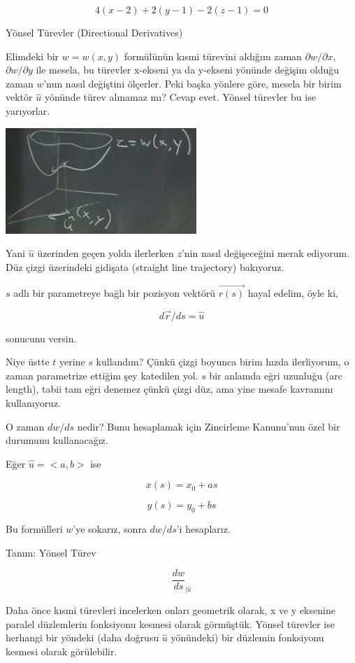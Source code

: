 \documentclass[12pt,fleqn]{article}\usepackage{../../common}
\begin{document}
$$ 4(x-2) + 2(y-1) - 2(z-1) = 0 $$

Yönsel Türevler (Directional Derivatives) 

Elimdeki bir $w = w(x,y)$ formülünün kısmi türevini aldığım zaman $\partial
w/\partial x$, $\partial w/\partial y$ ile mesela, bu türevler x-ekseni ya da
y-ekseni yönünde değişim olduğu zaman $w$'nun nasıl değiştini ölçerler. Peki
başka yönlere göre, mesela bir birim vektör $\hat{u}$ yönünde türev alınamaz mı?
Cevap evet. Yönsel türevler bu ise yarıyorlar.

\begin{center}
\includegraphics[height=4cm]{12_6.png}
\end{center}

Yani $\hat{u}$ üzerinden geçen yolda ilerlerken $z$'nin nasıl değişeceğini merak
ediyorum. Düz çizgi üzerindeki gidişata (straight line trajectory) bakıyoruz.

$s$ adlı bir parametreye bağlı bir pozisyon vektörü $\vec{r(s)}$ hayal
edelim, öyle ki,

$$ d\vec{r}/ds = \hat{u} $$

sonucunu versin.

Niye üstte $t$ yerine $s$ kullandım? Çünkü çizgi boyunca birim hızda
ilerliyorum, o zaman parametrize ettiğim şey katedilen yol. $s$ bir anlamda eğri
uzunluğu (arc length), tabii tam eğri denemez çünkü çizgi düz, ama yine mesafe
kavramını kullanıyoruz.

O zaman $dw/ds$ nedir? Bunu hesaplamak için Zincirleme Kanunu'nun özel bir
durumunu kullanacağız.

Eğer $\hat{u} = <a,b>$ ise

$$ x(s) = x_0 + as $$

$$ y(s) = y_0 + bs $$

Bu formülleri $w$'ye sokarız, sonra $dw/ds$'i hesaplarız. 

Tanım: Yönsel Türev

$$ \frac{dw}{ds}_{|\hat{u}} $$

Daha önce kısmi türevleri incelerken onları geometrik olarak, x ve y
eksenine paralel düzlemlerin fonksiyonu kesmesi olarak görmüştük. Yönsel
türevler ise herhangi bir yöndeki (daha doğrusu $\hat{u}$ yönündeki) bir
düzlemin fonksiyonu kesmesi olarak görülebilir.
\end{document}

